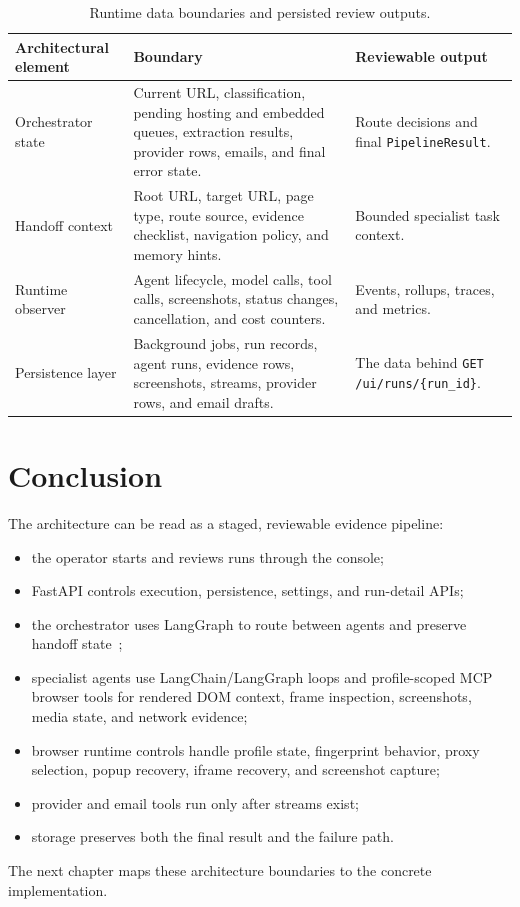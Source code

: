 \begin{table}[!htbp]
\centering
\begin{tabularx}{\textwidth}{Q{3.1cm} Y Y}
\toprule
{}
Architectural element & Boundary & Reviewable output \\
\midrule
Orchestrator state & Current URL, classification, pending hosting and embedded
queues, extraction results, provider rows, emails, and final error state. &
Route decisions and final \texttt{PipelineResult}. \\
Handoff context & Root URL, target URL, page type, route source, evidence
checklist, navigation policy, and memory hints. & Bounded specialist task
context. \\
Runtime observer & Agent lifecycle, model calls, tool calls, screenshots,
status changes, cancellation, and cost counters. & Events, rollups, traces, and
metrics. \\
Persistence layer & Background jobs, run records, agent runs, evidence rows,
screenshots, streams, provider rows, and email drafts. & The data behind
\texttt{GET /ui/runs/\{run\_id\}}. \\
\bottomrule
\end{tabularx}
\caption{Runtime data boundaries and persisted review outputs.}\label{tab:architecture-data-boundaries}
\end{table}

\section{Conclusion}

The architecture can be read as a staged, reviewable evidence pipeline:
\begin{itemize}
  \item the operator starts and reviews runs through the console;
  \item FastAPI controls execution, persistence, settings, and run-detail APIs;
  \item the orchestrator uses LangGraph to route between agents and preserve
  handoff state~\cite{langchain-docs,langgraph-docs};
  \item specialist agents use LangChain/LangGraph loops and profile-scoped MCP
  browser tools for rendered DOM context, frame inspection, screenshots, media
  state, and network evidence;
  \item browser runtime controls handle profile state, fingerprint behavior,
  proxy selection, popup recovery, iframe recovery, and screenshot capture;
  \item provider and email tools run only after streams exist;
  \item storage preserves both the final result and the failure path.
\end{itemize}

The next chapter maps these architecture boundaries to the concrete implementation.
